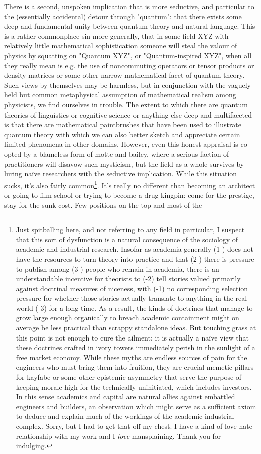 There is a second, unspoken implication that is more seductive, and particular to the (essentially accidental) detour through "quantum": that there exists some deep and fundamental unity between quantum theory and natural language. This is a rather commonplace sin more generally, that in some field XYZ with relatively little mathematical sophistication someone will steal the valour of physics by squatting on "Quantum XYZ", or "Quantum-inspired XYZ", when all they really mean is e.g. the use of noncommuting operators or tensor products or density matrices or some other narrow mathematical facet of quantum theory. Such views by themselves may be harmless, but in conjunction with the vaguely held but common metaphysical assumption of mathematical realism among physicists, we find ourselves in trouble. The extent to which there are quantum theories of linguistics or cognitive science or anything else deep and multifaceted is that there are mathematical paintbrushes that have been used to illustrate quantum theory with which we can also better sketch and appreciate certain limited phenomena in other domains. However, even this honest appraisal is co-opted by a blameless form of motte-and-bailey, where a serious faction of practitioners will disavow such mysticism, but the field as a whole survives by luring na\"{i}ve researchers with the seductive implication. While this situation sucks, it's also fairly common\footnote{Just spitballing here, and not referring to any field in particular, I suspect that this sort of dysfunction is a natural consequence of the sociology of academic and industrial research. Insofar as academia generally (1-) does not have the resources to turn theory into practice and that (2-) there is pressure to publish among (3-) people who remain in academia, there is an understandable incentive for theorists to (-2) tell stories valued primarily against doctrinal measures of niceness, with (-1) no corresponding selection pressure for whether those stories actually translate to anything in the real world (-3) for a long time. As a result, the kinds of doctrines that manage to grow large enough organically to breach academic containment might on average be less practical than scrappy standalone ideas. But touching grass at this point is not enough to cure the ailment: it is actually a na\"{i}ve view that these doctrines crafted in ivory towers immediately perish in the sunlight of a free market economy. While these myths are endless sources of pain for the engineers who must bring them into fruition, they are crucial memetic pillars for kayfabe or some other epistemic asymmetry that serve the purpose of keeping morale high for the technically uninitiated, which includes investors. In this sense academics and capital are natural allies against embattled engineers and builders, an observation which might serve as a sufficient axiom to deduce and explain much of the workings of the academic-industrial complex. Sorry, but I had to get that off my chest. I have a kind of love-hate relationship with my work and I \emph{love} mansplaining. Thank you for indulging.}. It's really no different than becoming an architect or going to film school or trying to become a drug kingpin: come for the prestige, stay for the sunk-cost. Few positions on the top and most of the 